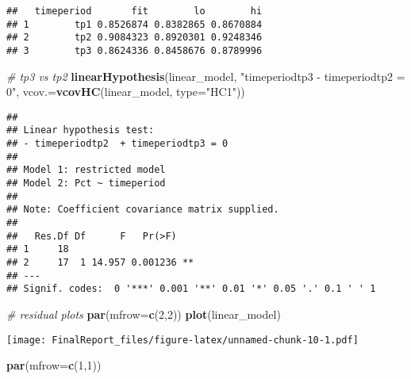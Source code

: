 \documentclass[
]{article}
\newenvironment{Shaded}{\begin{snugshade}}{\end{snugshade}}
\newcommand{\AttributeTok}[1]{\textcolor[rgb]{0.13,0.29,0.53}{#1}}
\newcommand{\CommentTok}[1]{\textcolor[rgb]{0.56,0.35,0.01}{\textit{#1}}}
\newcommand{\DecValTok}[1]{\textcolor[rgb]{0.00,0.00,0.81}{#1}}
\newcommand{\FunctionTok}[1]{\textcolor[rgb]{0.13,0.29,0.53}{\textbf{#1}}}
\newcommand{\NormalTok}[1]{#1}
\newcommand{\StringTok}[1]{\textcolor[rgb]{0.31,0.60,0.02}{#1}}
\begin{document}
\begin{verbatim}
##   timeperiod       fit        lo        hi
## 1        tp1 0.8526874 0.8382865 0.8670884
## 2        tp2 0.9084323 0.8920301 0.9248346
## 3        tp3 0.8624336 0.8458676 0.8789996
\end{verbatim}

\begin{Shaded}
\begin{Highlighting}[]
\CommentTok{\# tp3 vs tp2}
\FunctionTok{linearHypothesis}\NormalTok{(linear\_model, }\StringTok{"timeperiodtp3 {-} timeperiodtp2 = 0"}\NormalTok{, }
                 \AttributeTok{vcov.=}\FunctionTok{vcovHC}\NormalTok{(linear\_model, }\AttributeTok{type=}\StringTok{"HC1"}\NormalTok{))}
\end{Highlighting}
\end{Shaded}

\begin{verbatim}
## 
## Linear hypothesis test:
## - timeperiodtp2  + timeperiodtp3 = 0
## 
## Model 1: restricted model
## Model 2: Pct ~ timeperiod
## 
## Note: Coefficient covariance matrix supplied.
## 
##   Res.Df Df      F   Pr(>F)   
## 1     18                      
## 2     17  1 14.957 0.001236 **
## ---
## Signif. codes:  0 '***' 0.001 '**' 0.01 '*' 0.05 '.' 0.1 ' ' 1
\end{verbatim}

\begin{Shaded}
\begin{Highlighting}[]
\CommentTok{\# residual plots}
\FunctionTok{par}\NormalTok{(}\AttributeTok{mfrow=}\FunctionTok{c}\NormalTok{(}\DecValTok{2}\NormalTok{,}\DecValTok{2}\NormalTok{))}
\FunctionTok{plot}\NormalTok{(linear\_model)}
\end{Highlighting}
\end{Shaded}

\texttt{[image: FinalReport\_files/figure-latex/unnamed-chunk-10-1.pdf]}

\begin{Shaded}
\begin{Highlighting}[]
\FunctionTok{par}\NormalTok{(}\AttributeTok{mfrow=}\FunctionTok{c}\NormalTok{(}\DecValTok{1}\NormalTok{,}\DecValTok{1}\NormalTok{))}
\end{Highlighting}
\end{Shaded}
\end{document}

